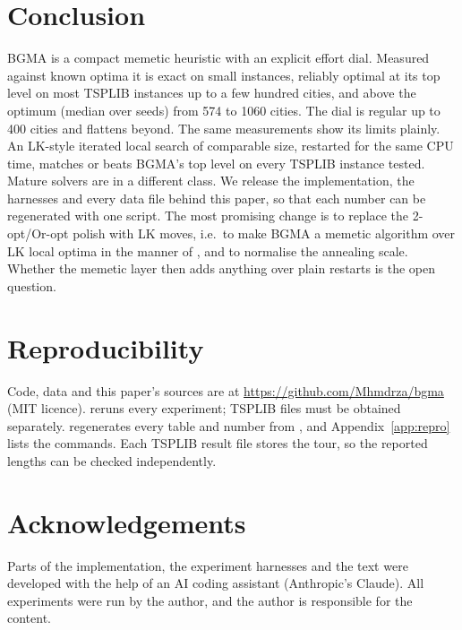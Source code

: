 \section{Conclusion}\label{sec:conclusion}

BGMA is a compact memetic heuristic with an explicit effort dial. Measured against known optima it is
exact on small instances, reliably optimal at its top level on most TSPLIB instances up to a few
hundred cities, and  above the optimum (median over seeds) from 574 to 1060 cities. The dial is regular up
to 400 cities and flattens beyond. The same measurements show its limits plainly. An LK-style iterated
local search of comparable size, restarted for the same CPU time, matches or beats BGMA's top level on
every TSPLIB instance tested. Mature solvers are in a different class. We release the implementation,
the harnesses and every data file behind this paper, so that each number can be regenerated with one
script. The most promising change is to replace the 2-opt/Or-opt polish with LK moves, i.e.\ to make
BGMA a memetic algorithm over LK local optima in the manner of \citet{merz2001}, and to normalise the
annealing scale. Whether the memetic layer then adds anything over plain restarts is the open question.

\section*{Reproducibility}
Code, data and this paper's sources are at \url{https://github.com/Mhmdrza/bgma} (MIT
licence).  reruns every experiment; TSPLIB files must be obtained separately.
 regenerates every table and number from , and
Appendix~\ref{app:repro} lists the commands. Each TSPLIB result file stores the tour, so the reported
lengths can be checked independently.

\section*{Acknowledgements}
Parts of the implementation, the experiment harnesses and the text were developed with the help of an
AI coding assistant (Anthropic's Claude). All experiments were run by the author, and the author is
responsible for the content.
